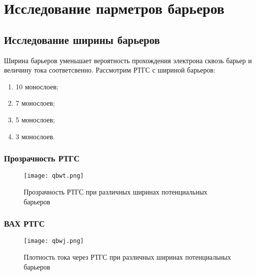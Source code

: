 \section{Исследование парметров барьеров}

\subsection{Исследование ширины барьеров}
Ширина барьеров уменьшает вероятность прохождения электрона сквозь барьер и величину тока соответсвенно. Рассмотрим РТГС с шириной барьеров:
\begin{enumerate}
	\item 10 монослоев;
	\item 7 монослоев;
	\item 5 монослоев;
	\item 3 монослоев.
\end{enumerate}

\subsubsection{Прозрачность РТГС}
\begin{figure}[h]
	\centering
	\texttt{[image: qbwt.png]}
	\caption{Прозрачность РТГС при различных ширинах потенциальных барьеров}
	\label{fig:qbwt}
\end{figure}

\subsubsection{ВАХ РТГС}
\begin{figure}[h]
	\centering
	\texttt{[image: qbwj.png]}
	\caption{Плотность тока через РТГС при различных ширинах потенциальных барьеров}
	\label{fig:qbwj}
\end{figure}